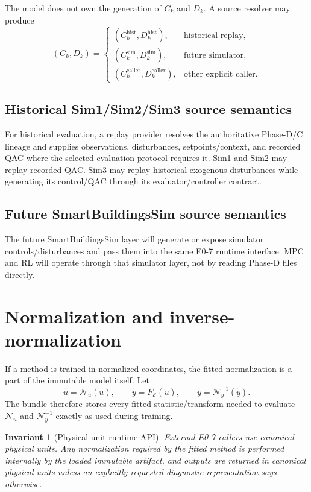 \documentclass[11pt]{article}
\newcommand{\Exec}{\mathcal{E}}
\newtheorem{invariant}{Invariant}
\begin{document}
The model does not own the generation of $C_k$ and $D_k$. A source resolver may
produce
\[
(C_k,D_k)=
\begin{cases}
(C_k^{\mathrm{hist}},D_k^{\mathrm{hist}}), & \text{historical replay},\\
(C_k^{\mathrm{sim}},D_k^{\mathrm{sim}}), & \text{future simulator},\\
(C_k^{\mathrm{caller}},D_k^{\mathrm{caller}}), & \text{other explicit caller}.
\end{cases}
\]

\subsection{Historical Sim1/Sim2/Sim3 source semantics}
For historical evaluation, a replay provider resolves the authoritative
Phase-D/C lineage and supplies observations, disturbances, setpoints/context,
and recorded QAC where the selected evaluation protocol requires it. Sim1 and
Sim2 may replay recorded QAC. Sim3 may replay historical exogenous disturbances
while generating its control/QAC through its evaluator/controller contract.

\subsection{Future SmartBuildingsSim source semantics}
The future SmartBuildingsSim layer will generate or expose simulator
controls/disturbances and pass them into the same E0-7 runtime interface. MPC and
RL will operate through that simulator layer, not by reading Phase-D files
directly.

\section{Normalization and inverse-normalization}

If a method is trained in normalized coordinates, the fitted normalization is a
part of the immutable model itself. Let
\[
\tilde u=\mathcal N_u(u),\qquad
\tilde y=F_{\Exec}(\tilde u),\qquad
y=\mathcal N_y^{-1}(\tilde y).
\]
The bundle therefore stores every fitted statistic/transform needed to evaluate
$\mathcal N_u$ and $\mathcal N_y^{-1}$ exactly as used during training.

\begin{invariant}[Physical-unit runtime API]
External E0-7 callers use canonical physical units. Any normalization required
by the fitted method is performed internally by the loaded immutable artifact,
and outputs are returned in canonical physical units unless an explicitly
requested diagnostic representation says otherwise.
\end{invariant}
\end{document}
